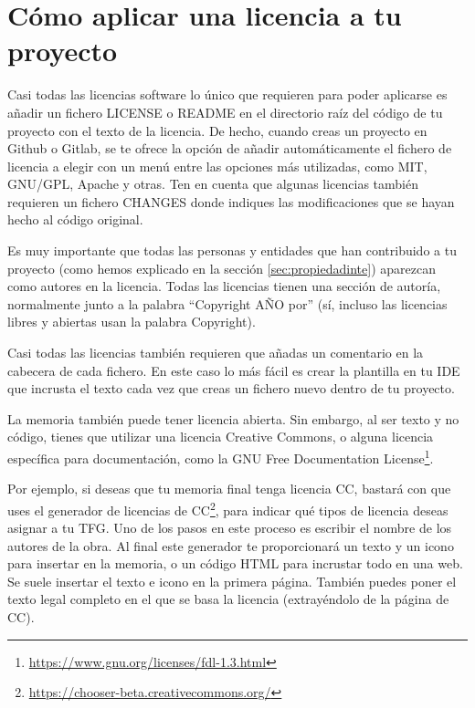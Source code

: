\section{Cómo aplicar una licencia a tu proyecto}

Casi todas las licencias software lo único que requieren para poder aplicarse es añadir un fichero LICENSE o README en el directorio raíz del código de tu proyecto con el texto de la licencia. De hecho, cuando creas un proyecto en Github o Gitlab, se te ofrece la opción de añadir automáticamente el fichero de licencia a elegir con un menú entre las opciones más utilizadas, como MIT, GNU/GPL, Apache y otras. Ten en cuenta que algunas licencias también requieren un fichero CHANGES donde indiques las modificaciones que se hayan hecho al código original.

Es muy importante que todas las personas y entidades que han contribuido a tu proyecto (como hemos explicado en la sección \ref{sec:propiedadinte}) aparezcan como autores en la licencia. Todas las licencias tienen una sección de autoría, normalmente junto a la palabra ``Copyright AÑO por'' (sí, incluso las licencias libres y abiertas usan la palabra Copyright).

Casi todas las licencias también requieren que añadas un comentario en la cabecera de cada fichero. En este caso lo más fácil es crear la plantilla en tu IDE que incrusta el texto cada vez que creas un fichero nuevo dentro de tu proyecto.

La memoria también puede tener licencia abierta. Sin embargo, al ser texto y no código, tienes que utilizar una licencia Creative Commons, o alguna licencia específica para documentación, como la GNU Free Documentation License\footnote{\url{https://www.gnu.org/licenses/fdl-1.3.html}}.

Por ejemplo, si deseas que tu memoria final tenga licencia CC, bastará con que uses el generador de licencias de CC\footnote{\url{https://chooser-beta.creativecommons.org/}}, para indicar qué tipos de licencia deseas asignar a tu TFG. Uno de los pasos en este proceso es escribir el nombre de los autores de la obra. Al final este generador te proporcionará un texto y un icono para insertar en la memoria, o un código HTML para incrustar todo en una web. Se suele insertar el texto e icono en la primera página. También puedes poner el texto legal completo en el que se basa la licencia (extrayéndolo de la página de CC). %


